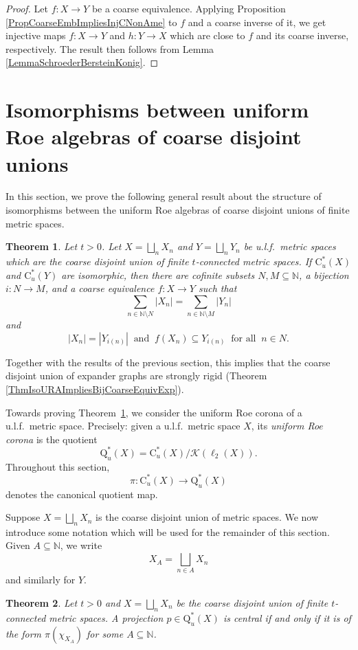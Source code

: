 \documentclass[11pt]{amsart}
\newcommand{\N}{\mathbb{N}}
\newcommand{\cstu}{\mathrm{C}^*_u}
\newcommand{\roeq}{\mathrm{Q}^*_u}
\newcommand{\bbN}{\mathbb{N}}
\newcommand{\cK}{\mathcal{K}}
\numberwithin{equation}{section}
\newtheorem{theorem}{Theorem}[section]
\theoremstyle{definition}
\theoremstyle{remark}
\numberwithin{equation}{section}
\begin{document}
\begin{proof}
Let $f\colon X\to Y$ be a coarse equivalence. Applying Proposition \ref{PropCoarseEmbImpliesInjCNonAme} to $f$ and a coarse inverse of it, we get injective maps $f\colon X \to Y$ and $h\colon Y \to X$ which are close to $f$ and its coarse inverse, respectively. The result then follows from Lemma \ref{LemmaSchroederBersteinKonig}.
\end{proof}

\section{Isomorphisms between uniform Roe algebras of coarse disjoint unions}\label{sec:Roe}

In this section, we prove the following general result about the structure of isomorphisms between the uniform Roe algebras of coarse disjoint unions of finite metric spaces.
\begin{theorem}\label{T.|Xn|=|Yn|}
Let $t>0$. Let $X=\bigsqcup_nX_n$ and $Y=\bigsqcup_nY_n$ be u.l.f.\ metric spaces which are the coarse disjoint union of finite $t$-connected metric spaces. If $\cstu(X)$ and $\cstu(Y)$ are isomorphic, then there are cofinite subsets $N,M\subseteq\N$, a bijection $i\colon N\to M$, and a coarse equivalence $f\colon X\to Y$ such that 
\[\sum_{n\in \N\setminus N}|X_n|=\sum_{n\in \N\setminus M}|Y_n|\]
and 
\[|X_n|=|Y_{i(n)}|\ \text{ and }\ f(X_n)\subseteq Y_{i(n)}\ \text{ for all }\ n\in N.\]
\end{theorem}

Together with the results of the previous section, this implies that the coarse disjoint union of expander graphs are strongly rigid (Theorem \ref{ThmIsoURAImpliesBijCoarseEquivExp}).

Towards proving Theorem~\ref{T.|Xn|=|Yn|}, we consider the uniform Roe corona of a u.l.f.\ metric space. Precisely: given a u.l.f.\ metric space $X$, its \emph{uniform Roe corona} is the quotient
\[
\roeq(X)=\cstu(X)/\cK(\ell_2(X)).
\]
Throughout this section, 
\[
\pi\colon \cstu(X)\to \roeq(X)
\] 
denotes the canonical quotient map. 

Suppose $X=\bigsqcup_n X_n$ is the coarse disjoint union of metric spaces. We now introduce some notation which will be used for the remainder of this section. Given $A\subseteq \bbN$, we write 
\[
X_A=\bigsqcup_{n\in A} X_n
\]
and similarly for $Y$.

\begin{theorem}\label{T.Q(X).CentralProjection}
Let $t>0$ and $X=\bigsqcup_nX_n$ be the coarse disjoint union of finite $t$-connected metric spaces. A projection $p\in \roeq(X)$ is central if and only if it is of the form $\pi( \chi_{X_A})$ for some $A\subseteq \bbN$. 
\end{theorem}
\end{document}
